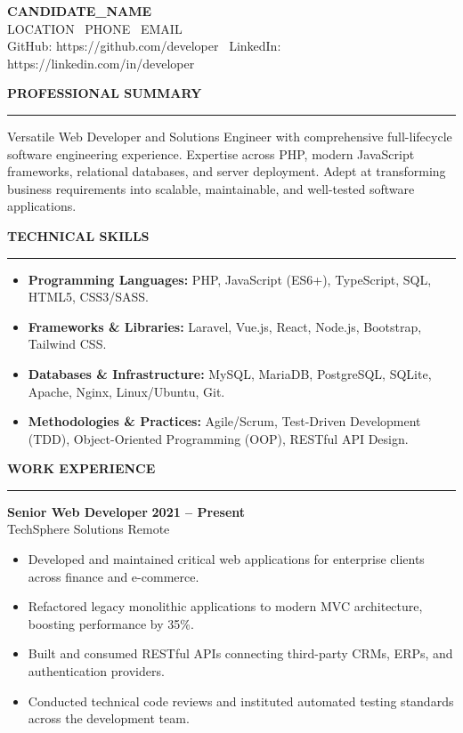 \documentclass[11pt,a4paper]{article}
\begin{document}
\begin{center}
    {\LARGE \textbf{{{CANDIDATE_NAME}}}}\\[4pt]
    {{LOCATION}} \textbar\ {{PHONE}} \textbar\ {{EMAIL}}\\[2pt]
    GitHub: https://github.com/developer \textbar\ LinkedIn: https://linkedin.com/in/developer
\end{center}

\vspace{6pt}
\noindent\textbf{\large PROFESSIONAL SUMMARY}
\vspace{2pt}\hrule\vspace{4pt}
Versatile Web Developer and Solutions Engineer with comprehensive full-lifecycle software engineering experience. Expertise across PHP, modern JavaScript frameworks, relational databases, and server deployment. Adept at transforming business requirements into scalable, maintainable, and well-tested software applications.

\vspace{8pt}
\noindent\textbf{\large TECHNICAL SKILLS}
\vspace{2pt}\hrule\vspace{4pt}
\begin{itemize}
    \item \textbf{Programming Languages:} PHP, JavaScript (ES6+), TypeScript, SQL, HTML5, CSS3/SASS.
    \item \textbf{Frameworks \& Libraries:} Laravel, Vue.js, React, Node.js, Bootstrap, Tailwind CSS.
    \item \textbf{Databases \& Infrastructure:} MySQL, MariaDB, PostgreSQL, SQLite, Apache, Nginx, Linux/Ubuntu, Git.
    \item \textbf{Methodologies \& Practices:} Agile/Scrum, Test-Driven Development (TDD), Object-Oriented Programming (OOP), RESTful API Design.
\end{itemize}

\vspace{8pt}
\noindent\textbf{\large WORK EXPERIENCE}
\vspace{2pt}\hrule\vspace{4pt}

\noindent\textbf{Senior Web Developer} \hfill \textbf{2021 -- Present}\\
TechSphere Solutions \hfill Remote
\begin{itemize}
    \item Developed and maintained critical web applications for enterprise clients across finance and e-commerce.
    \item Refactored legacy monolithic applications to modern MVC architecture, boosting performance by 35\%.
    \item Built and consumed RESTful APIs connecting third-party CRMs, ERPs, and authentication providers.
    \item Conducted technical code reviews and instituted automated testing standards across the development team.
\end{itemize}
\end{document}
